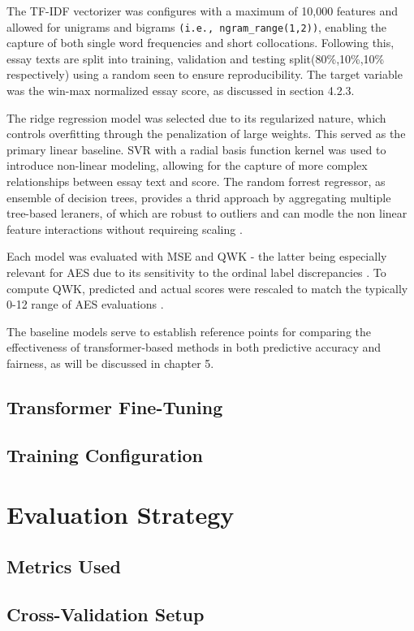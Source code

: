 \documentclass[12pt,a4paper]{report}
\begin{document}
The TF-IDF vectorizer was configures with a maximum of 10,000 features and allowed for unigrams and bigrams \texttt{(i.e., ngram\_range(1,2))}, enabling the capture of both single word frequencies and short collocations. Following this, essay texts are split into training, validation and testing split(80\%,10\%,10\% respectively) using a random seen to ensure reproducibility. The target variable was the win-max normalized essay score, as discussed in section 4.2.3.

The ridge regression model was selected due to its regularized nature, which controls overfitting through the penalization of large weights. This served as the primary linear baseline. SVR with a radial basis function kernel was used to introduce non-linear modeling, allowing for the capture of more complex relationships between essay text and score. The random forrest regressor, as ensemble of decision trees, provides a thrid approach by aggregating multiple tree-based leraners, of which are robust to outliers and can modle the non linear feature interactions without requireing scaling \citep{breiman2001random}.

Each model was evaluated with MSE and QWK - the latter being especially relevant for AES due to its sensitivity to the ordinal label discrepancies \citep{cohen1968kappa}. To compute QWK, predicted and actual scores were rescaled to match the typically 0-12 range of AES evaluations \citep{taghipour2016neural}.

The baseline models serve to establish reference points for comparing the effectiveness of transformer-based methods in both predictive accuracy and fairness, as will be discussed in chapter 5.


\subsection{Transformer Fine-Tuning}
\subsection{Training Configuration}
\section{Evaluation Strategy}
\subsection{Metrics Used}
\subsection{Cross-Validation Setup}
\end{document}
